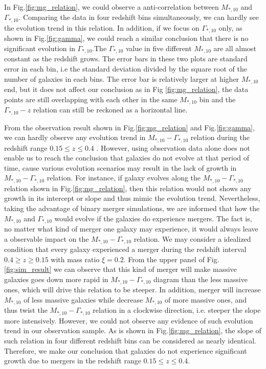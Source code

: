 \documentclass[fleqn,usenatbib]{mnras}
\begin{document}
\par In Fig.\ref{fig:mg_relation}, we could observe a anti-correlation between $M_{*,10}$ and $\Gamma_{*,10}$. Comparing the data in four redshift bins simultaneously, we can hardly see the evolution trend in this relation. In addition, if we focus on $\Gamma_{*,10}$ only, as shown in Fig.\ref{fig:gamma}, we could reach a similar conclusion that there is no significant evolution in $\Gamma_{*,10}$.The $\Gamma_{*,10}$ value in five different $M_{*,10}$ are all almost constant as the redshift grows. The error bars in these two plots are standard error in each bin, i.e the standard deviation divided by the square root of the number of galaxies in each bins. The error bar is relatively larger at higher $M_{*,10}$ end, but it does not affect our conclusion as in Fig \ref{fig:mg_relation}, the data points are still overlapping with each other in the same $M_{*,10}$ bin and the $\Gamma_{*,10} - z$ relation can still be reckoned as a horizontal line. 
\par From the observation result shown in Fig.\ref{fig:mg_relation} and Fig.\ref{fig:gamma}, we can hardly observe any evolution trend in $M_{*,10} - \Gamma_{*,10}$ relation during the redshift range $ 0.15 \leq z \leq 0.4$ . However, using observation data alone does not enable us to reach the conclusion that galaxies do not evolve at that period of time, cause various evolution scenarios may result in the lack of growth in $M_{*,10} - \Gamma_{*,10}$ relation. For instance, if galaxy evolves along the $M_{*,10} - \Gamma_{*,10}$ relation shown in Fig.\ref{fig:mg_relation}, then this relation would not shows any growth in its intercept or slope and thus mimic the evolution trend. Nevertheless, taking the advantage of binary merger simulations, we are informed that how the $M_{*,10} $ and $\Gamma_{*,10}$ would evolve if the galaxies do experience mergers. The fact is, no matter what kind of merger one galaxy may experience, it would always leave a observable impact on the $M_{*,10} - \Gamma_{*,10}$ relation. We may consider a idealized condition that every galaxy experienced a merger during the redshift interval $0.4 \geq z \geq 0.15$ with mass ratio $\xi = 0.2$. From the upper panel of Fig.\ref{fig:sim_result} we can observe that this kind of merger will make massive galaxies goes down more rapid in $M_{*,10}-\Gamma_{*,10}$ diagram than the less massive ones, which will drive this relation to be steeper. In addition, merger will increase $M_{*,10}$ of less massive galaxies while decrease $M_{*,10}$ of more massive ones, and thus twist the $M_{*,10}-\Gamma_{*,10}$ relation in a clockwise direction, i.e. steeper the slope more intensively. However, we could not observe any evidence of such evolution trend in our observation sample. As is shown in Fig.\ref{fig:mg_relation}, the slope of such relation in four different redshift bins can be considered as nearly identical. Therefore, we make our conclusion that galaxies do not experience significant growth due to mergers in the redshift range $0.15 \leq z \leq 0.4$.
\end{document}
